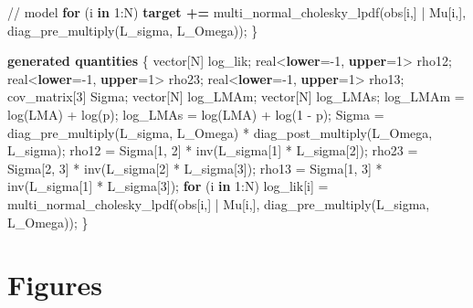 \documentclass[
  12pt,
  letterpaper,
  DIV=11,
  numbers=noendperiod]{scrartcl}
\newenvironment{Shaded}{\begin{snugshade}}{\end{snugshade}}
\newcommand{\CommentTok}[1]{\textcolor[rgb]{0.37,0.37,0.37}{#1}}
\newcommand{\ControlFlowTok}[1]{\textcolor[rgb]{0.00,0.23,0.31}{\textbf{#1}}}
\newcommand{\DataTypeTok}[1]{\textcolor[rgb]{0.68,0.00,0.00}{#1}}
\newcommand{\DecValTok}[1]{\textcolor[rgb]{0.68,0.00,0.00}{#1}}
\newcommand{\KeywordTok}[1]{\textcolor[rgb]{0.00,0.23,0.31}{\textbf{#1}}}
\newcommand{\NormalTok}[1]{\textcolor[rgb]{0.00,0.23,0.31}{#1}}
\numberwithin{equation}{section}
\begin{document}
\begin{Shaded}
\begin{Highlighting}[]
  \CommentTok{// model}
  \ControlFlowTok{for}\NormalTok{ (i }\ControlFlowTok{in} \DecValTok{1}\NormalTok{:N)}
     \KeywordTok{target +=}\NormalTok{ multi\_normal\_cholesky\_lpdf(obs[i,] | Mu[i,], diag\_pre\_multiply(L\_sigma, L\_Omega));}
\NormalTok{\}}

\KeywordTok{generated quantities}\NormalTok{ \{}
  \DataTypeTok{vector}\NormalTok{[N] log\_lik;}
  \DataTypeTok{real}\NormalTok{\textless{}}\KeywordTok{lower}\NormalTok{={-}}\DecValTok{1}\NormalTok{, }\KeywordTok{upper}\NormalTok{=}\DecValTok{1}\NormalTok{\textgreater{} rho12;}
  \DataTypeTok{real}\NormalTok{\textless{}}\KeywordTok{lower}\NormalTok{={-}}\DecValTok{1}\NormalTok{, }\KeywordTok{upper}\NormalTok{=}\DecValTok{1}\NormalTok{\textgreater{} rho23;}
  \DataTypeTok{real}\NormalTok{\textless{}}\KeywordTok{lower}\NormalTok{={-}}\DecValTok{1}\NormalTok{, }\KeywordTok{upper}\NormalTok{=}\DecValTok{1}\NormalTok{\textgreater{} rho13;}
  \DataTypeTok{cov\_matrix}\NormalTok{[}\DecValTok{3}\NormalTok{] Sigma;}
  \DataTypeTok{vector}\NormalTok{[N] log\_LMAm;}
  \DataTypeTok{vector}\NormalTok{[N] log\_LMAs;}
\NormalTok{  log\_LMAm = log(LMA) + log(p);}
\NormalTok{  log\_LMAs = log(LMA) + log(}\DecValTok{1}\NormalTok{ {-} p);}
\NormalTok{  Sigma = diag\_pre\_multiply(L\_sigma, L\_Omega)}
\NormalTok{     * diag\_post\_multiply(L\_Omega\textquotesingle{}, L\_sigma);}
\NormalTok{  rho12 = Sigma[}\DecValTok{1}\NormalTok{, }\DecValTok{2}\NormalTok{] * inv(L\_sigma[}\DecValTok{1}\NormalTok{] * L\_sigma[}\DecValTok{2}\NormalTok{]);}
\NormalTok{  rho23 = Sigma[}\DecValTok{2}\NormalTok{, }\DecValTok{3}\NormalTok{] * inv(L\_sigma[}\DecValTok{2}\NormalTok{] * L\_sigma[}\DecValTok{3}\NormalTok{]);}
\NormalTok{  rho13 = Sigma[}\DecValTok{1}\NormalTok{, }\DecValTok{3}\NormalTok{] * inv(L\_sigma[}\DecValTok{1}\NormalTok{] * L\_sigma[}\DecValTok{3}\NormalTok{]);}
  \ControlFlowTok{for}\NormalTok{ (i }\ControlFlowTok{in} \DecValTok{1}\NormalTok{:N)}
\NormalTok{   log\_lik[i] = multi\_normal\_cholesky\_lpdf(obs[i,] | Mu[i,], diag\_pre\_multiply(L\_sigma, L\_Omega));}
\NormalTok{ \}}
\end{Highlighting}
\end{Shaded}

\newpage

\section*{Figures}
\end{document}
